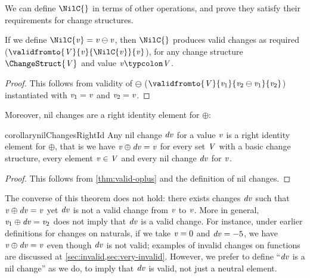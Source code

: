 We can define \ensuremath{\NilC{}} in terms of other
operations, and prove they satisfy their requirements for change
structures.

\begin{lemma}
  \label{lem:nilc-derived}
  If we define \ensuremath{\NilC{\Varid{v}}\mathrel{=}\Varid{v}\ominus \Varid{v}}, then \ensuremath{\NilC{}} produces
  valid changes as required (\ensuremath{\validfromto{\Conid{V}}{\Varid{v}}{\NilC{\Varid{v}}}{\Varid{v}}}), for any
  change structure \ensuremath{\ChangeStruct{\Conid{V}}} and value \ensuremath{\Varid{v}\typcolon\Conid{V}}.
\end{lemma}
\begin{proof}
  This follows from validity of \ensuremath{\ominus } (\ensuremath{\validfromto{\Conid{V}}{\Varid{v}_{1}}{\Varid{v}_{2}\ominus \Varid{v}_{1}}{\Varid{v}_{2}}}) instantiated with \ensuremath{\Varid{v}_{1}\mathrel{=}\Varid{v}} and \ensuremath{\Varid{v}_{2}\mathrel{=}\Varid{v}}.
\end{proof}

Moreover, nil changes are a right identity element for \ensuremath{\oplus }:
\begin{restatable}{corollary}{nilChangesRightId}
  \label{lem:nilChangesRightId}
  Any nil change \ensuremath{\Varid{dv}} for a value \ensuremath{\Varid{v}} is a right identity element for
  \ensuremath{\oplus }, that is we have \ensuremath{\Varid{v}\oplus \Varid{dv}\mathrel{=}\Varid{v}} for every set \ensuremath{\Conid{V}}
  with a basic change structure, every element \ensuremath{\Varid{v}\in \Conid{V}} and
  every nil change \ensuremath{\Varid{dv}} for \ensuremath{\Varid{v}}.
\end{restatable}
\begin{proof}
  This follows from \cref{thm:valid-oplus} and the definition of
  nil changes.
\end{proof}

The converse of this theorem does not hold: there exists changes
\ensuremath{\Varid{dv}} such that \ensuremath{\Varid{v}\oplus \Varid{dv}\mathrel{=}\Varid{v}} yet \ensuremath{\Varid{dv}} is not a valid change
from \ensuremath{\Varid{v}} to \ensuremath{\Varid{v}}.
More in general, \ensuremath{\Varid{v}_{1}\oplus \Varid{dv}\mathrel{=}\Varid{v}_{2}} does not imply that \ensuremath{\Varid{dv}} is a valid
change.
For instance, under earlier definitions for
changes on naturals, if we take \ensuremath{\Varid{v}\mathrel{=}\mathrm{0}} and \ensuremath{\Varid{dv}\mathrel{=}\mathbin{-}\mathrm{5}}, we have \ensuremath{\Varid{v}\oplus \Varid{dv}\mathrel{=}\Varid{v}} even though \ensuremath{\Varid{dv}} is not valid; examples of
invalid changes on functions are discussed at \cref{sec:invalid,sec:very-invalid}.
However, we prefer to define ``\ensuremath{\Varid{dv}} is a nil change'' as we do,
to imply that \ensuremath{\Varid{dv}} is valid, not just a neutral element.

